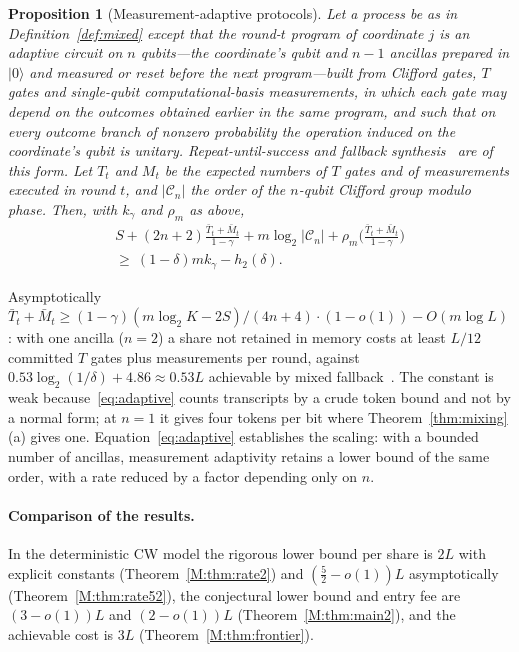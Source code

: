 \documentclass[aps,prx,twocolumn,superscriptaddress,nofootinbib,longbibliography]{revtex4-2}
\theoremstyle{plain}
\newtheorem{proposition}{Proposition}
\theoremstyle{definition}
\theoremstyle{remark}
\begin{document}
\begin{proposition}[Measurement-adaptive protocols]\label{prop:adaptive}
Let a process be as in Definition~\ref{def:mixed} except that the round-$t$ program of coordinate $j$ is an adaptive circuit on $n$ qubits---the coordinate's qubit and $n-1$ ancillas prepared in $|0\rangle$ and measured or reset before the next program---built from Clifford gates, $T$ gates and single-qubit computational-basis measurements, in which each gate may depend on the outcomes obtained earlier in the same program, and such that on every outcome branch of nonzero probability the operation induced on the coordinate's qubit is unitary. Repeat-until-success and fallback synthesis~\cite{BRS,KLMPP} are of this form. Let $T_t$ and $M_t$ be the expected numbers of $T$ gates and of measurements executed in round $t$, and $|\mathcal C_n|$ the order of the $n$-qubit Clifford group modulo phase. Then, with $k_\gamma$ and $\rho_m$ as above,
\begin{multline}\label{eq:adaptive}
S+(2n+2)\frac{\bar T_t+\bar M_t}{1-\gamma}+m\log_2|\mathcal C_n|+\rho_m\Big(\frac{\bar T_t+\bar M_t}{1-\gamma}\Big)\\ \ge\ (1-\delta)mk_\gamma-h_2(\delta).
\end{multline}
\end{proposition}
Asymptotically $\bar T_t+\bar M_t\ge(1-\gamma)(m\log_2K-2S)/(4n+4)\cdot(1-o(1))-O(m\log L)$: with one ancilla ($n=2$) a share not retained in memory costs at least $L/12$ committed $T$ gates plus measurements per round, against $0.53\log_2(1/\delta)+4.86\approx0.53L$ achievable by mixed fallback~\cite[Eq.~(13)]{KLMPP,Bothe}. The constant is weak because~\eqref{eq:adaptive} counts transcripts by a crude token bound and not by a normal form; at $n=1$ it gives four tokens per bit where Theorem~\ref{thm:mixing}(a) gives one. Equation~\eqref{eq:adaptive} establishes the scaling: with a bounded number of ancillas, measurement adaptivity retains a lower bound of the same order, with a rate reduced by a factor depending only on $n$.

\paragraph{Comparison of the results.} In the deterministic CW model the rigorous lower bound per share is $2L$ with explicit constants (Theorem~\ref{M:thm:rate2}) and $(\tfrac52-o(1))L$ asymptotically (Theorem~\ref{M:thm:rate52}), the conjectural lower bound and entry fee are $(3-o(1))L$ and $(2-o(1))L$ (Theorem~\ref{M:thm:main2}), and the achievable cost is $3L$ (Theorem~\ref{M:thm:frontier}). 
\end{document}
